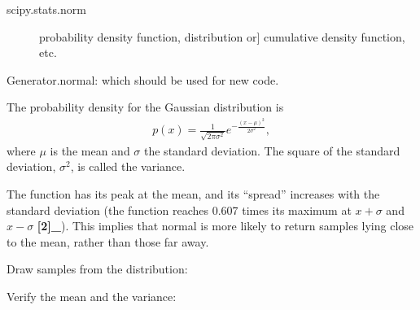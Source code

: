 \documentclass[letterpaper,10pt,english]{sphinxmanual}
\begin{document}
\begin{fulllineitems}
\begin{description}
\end{description}
\begin{description}
\item[{scipy.stats.norm}] \leavevmode{[}probability density function, distribution or{]}
cumulative density function, etc.

\end{description}

Generator.normal: which should be used for new code.

The probability density for the Gaussian distribution is
\begin{equation*}
\begin{split}p(x) = \frac{1}{\sqrt{ 2 \pi \sigma^2 }}
e^{ - \frac{ (x - \mu)^2 } {2 \sigma^2} },\end{split}
\end{equation*}
where \(\mu\) is the mean and \(\sigma\) the standard
deviation. The square of the standard deviation, \(\sigma^2\),
is called the variance.

The function has its peak at the mean, and its “spread” increases with
the standard deviation (the function reaches 0.607 times its maximum at
\(x + \sigma\) and \(x - \sigma\) {\color{red}\bfseries{}{[}2{]}\_}).  This implies that
normal is more likely to return samples lying close to the mean, rather
than those far away.

Draw samples from the distribution:

\begin{sphinxVerbatim}[commandchars=\\\{\}]
     
    
\end{sphinxVerbatim}

Verify the mean and the variance:

\begin{sphinxVerbatim}[commandchars=\\\{\}]
  
\end{sphinxVerbatim}


\end{fulllineitems}
\end{document}
